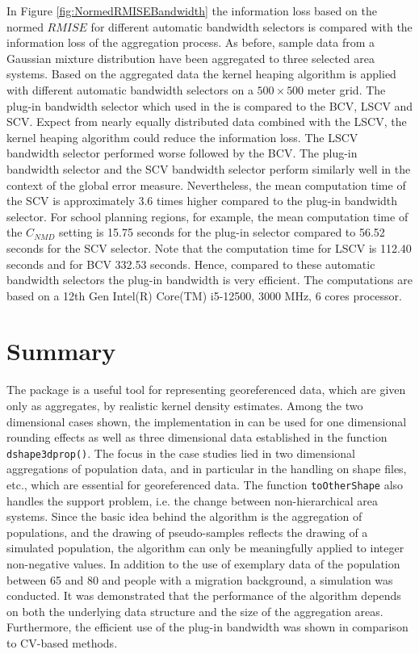 In Figure \ref{fig:NormedRMISEBandwidth} the information loss based on the normed $RMISE$ for different automatic bandwidth selectors is compared with the information loss of the aggregation process. 
As before, sample data from a Gaussian mixture distribution have been aggregated to three selected area systems. Based on the aggregated data the kernel heaping algorithm is applied with different automatic bandwidth selectors on a $500 \times 500$ meter grid. The plug-in bandwidth selector which used in the \hyperlink{https://cran.r-project.org/web/packages/Kernelheaping/index.html}{} is compared to the BCV, LSCV and SCV. 
Expect from nearly equally distributed data combined with the LSCV, the kernel heaping algorithm could reduce the information loss. The LSCV bandwidth selector performed worse followed by the BCV. The plug-in bandwidth selector and the SCV bandwidth selector perform similarly well in the context of the global error measure. Nevertheless, the mean computation time of the SCV is approximately 3.6 times higher compared to the plug-in bandwidth selector. 
For school planning regions, for example, the mean computation time of the $C_{NMD}$ setting is 
15.75 seconds for the plug-in selector compared to 56.52 seconds for the SCV selector. Note that the computation time for LSCV is 112.40 seconds and for BCV 332.53 seconds. 
Hence, compared to these automatic bandwidth selectors the plug-in bandwidth is very efficient. The computations are based on a 12th Gen Intel(R) Core(TM) i5-12500, 3000 MHz, 6 cores processor. 


\section{Summary}

The \hyperlink{https://cran.r-project.org/web/packages/Kernelheaping/index.html}{} package is a useful tool for representing georeferenced data, which are given only as aggregates, by realistic kernel density estimates. Among the two dimensional cases shown, the implementation in  can be used for one dimensional rounding effects as well as three dimensional data established in the function \texttt{dshape3dprop()}. 
The focus in the case studies lied in two dimensional aggregations of population data, and in particular in the handling on shape files, etc., which are essential for georeferenced data. The function \texttt{toOtherShape} also handles the support problem, i.e. the change between non-hierarchical area systems. Since the basic idea behind the algorithm is the aggregation of populations, and the drawing of pseudo-samples reflects the drawing of a simulated population, the algorithm can only be meaningfully applied to integer non-negative values. 
In addition to the use of exemplary data of the population between 65 and 80 and people with a migration background, a simulation was conducted. It was demonstrated that the performance of the algorithm depends on both the underlying data structure and the size of the aggregation areas. Furthermore, the efficient use of the plug-in bandwidth was shown in comparison to CV-based methods.



